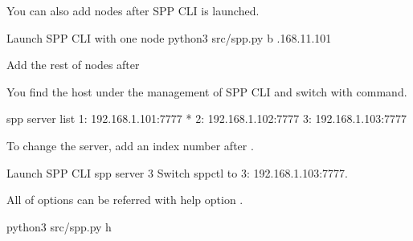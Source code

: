 \documentclass[a4paper,11pt,openany,oneside,english]{sphinxmanual}
\begin{document}
You can also add nodes after SPP CLI is launched.

\begin{sphinxVerbatim}[commandchars=\\\{\},formatcom=\footnotesize]
 Launch SPP CLI with one node
 python3 src/spp.py \PYGZhy{}b .168.11.101

 Add the rest of nodes after
\end{sphinxVerbatim}

You find the host under the management of SPP CLI and switch with
 command.

\begin{sphinxVerbatim}[commandchars=\\\{\},formatcom=\footnotesize]
spp \PYGZgt{} server list
  1: 192.168.1.101:7777 *
  2: 192.168.1.102:7777
  3: 192.168.1.103:7777
\end{sphinxVerbatim}

To change the server, add an index number after .

\begin{sphinxVerbatim}[commandchars=\\\{\},formatcom=\footnotesize]
\PYGZsh{} Launch SPP CLI
spp \PYGZgt{} server 3
Switch spp\PYGZhy{}ctl to \PYGZdq{}3: 192.168.1.103:7777\PYGZdq{}.
\end{sphinxVerbatim}

All of options can be referred with help option .

\begin{sphinxVerbatim}[commandchars=\\\{\},formatcom=\footnotesize]
 python3 src/spp.py \PYGZhy{}h


\end{sphinxVerbatim}
\end{document}
